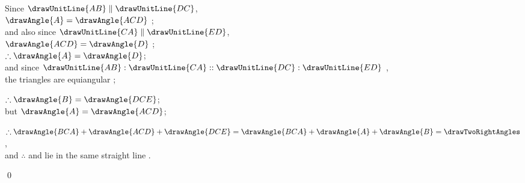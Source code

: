 \documentclass[booklanguage=english]{byrnebook}
\begin{document}
\begin{center}
Since $\drawUnitLine{AB} \parallel \drawUnitLine{DC}$,\\
$\drawAngle{A} = \drawAngle{ACD}$ ;\\
and also since $\drawUnitLine{CA} \parallel \drawUnitLine{ED}$,\\
$\drawAngle{ACD} = \drawAngle{D}$ ;\\
$\therefore \drawAngle{A} = \drawAngle{D}$;\\
and since $\drawUnitLine{AB} : \drawUnitLine{CA} :: \drawUnitLine{DC} : \drawUnitLine{ED}$ \byref{\hypref},\\
the triangles are equiangular ;

$\therefore \drawAngle{B} = \drawAngle{DCE}$;\\
but $\drawAngle{A} = \drawAngle{ACD}$;

$\therefore \drawAngle{BCA} + \drawAngle{ACD} + \drawAngle{DCE} = \drawAngle{BCA} + \drawAngle{A} + \drawAngle{B} = \drawTwoRightAngles$ ,\\
and $\therefore$  and  lie in the same straight line .
\end{center}

\qed
\end{document}
